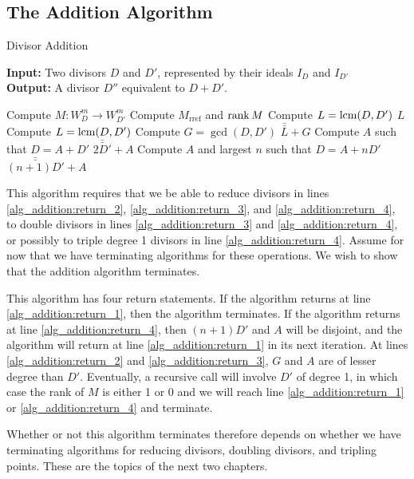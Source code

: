 
\subsection{The Addition Algorithm}

\begin{algorithm}[ht!]
  \label{alg_addition}
  \caption{Divisor Addition}
  {\bf Input:} Two divisors $D$ and $D'$, represented by their ideals $I_D$ and $I_{D'}$ \\
  {\bf Output:} A divisor $D''$ equivalent to $D + D'$.
  \begin{algorithmic}[1]
    \State Compute $M : W_D^m \to W_{D'}^m$
    \State Compute $M_{\text{rref}}$ and $\operatorname{rank} M$
      \State Compute $L = \operatorname{lcm}(D, D')$
      \State \Return $L$ \label{alg_addition:return_1}
    \EndIf
      \State Compute $L = \operatorname{lcm}(D, D')$
      \State Compute $G = \gcd(D, D')$
      \State \Return $\bar{\bar L} + G$ \label{alg_addition:return_2}
    \EndIf
        \State Compute $A$ such that $D = A + D'$
        \State \Return $\bar{\bar{2D'}} + A$ \label{alg_addition:return_3}
      \EndIf
        \State Compute $A$ and largest $n$ such that $D = A + nD'$
        \State \Return $\bar{\bar{(n+1)D'}} + A$ \label{alg_addition:return_4}
      \EndIf
    \EndIf
  \end{algorithmic}
\end{algorithm}

This algorithm requires that we be able to reduce divisors
in lines \ref{alg_addition:return_2}, \ref{alg_addition:return_3}, and \ref{alg_addition:return_4},
to double divisors in lines \ref{alg_addition:return_3} and \ref{alg_addition:return_4},
or possibly to triple degree 1 divisors in line \ref{alg_addition:return_4}.
Assume for now that we have terminating algorithms for these operations.
We wish to show that the addition algorithm terminates.

This algorithm has four return statements.
If the algorithm returns at line \ref{alg_addition:return_1},
then the algorithm terminates.
If the algorithm returns at line \ref{alg_addition:return_4},
then $(n + 1)D'$ and $A$ will be disjoint,
and the algorithm will return at line \ref{alg_addition:return_1} in its next iteration.
At lines \ref{alg_addition:return_2} and \ref{alg_addition:return_3},
$G$ and $A$ are of lesser degree than $D'$.
Eventually, a recursive call will involve $D'$ of degree 1,
in which case the rank of $M$ is either 1 or 0
and we will reach line \ref{alg_addition:return_1} or \ref{alg_addition:return_4} and terminate.

Whether or not this algorithm terminates therefore depends on whether we have terminating algorithms
for reducing divisors, doubling divisors, and tripling points.
These are the topics of the next two chapters.
